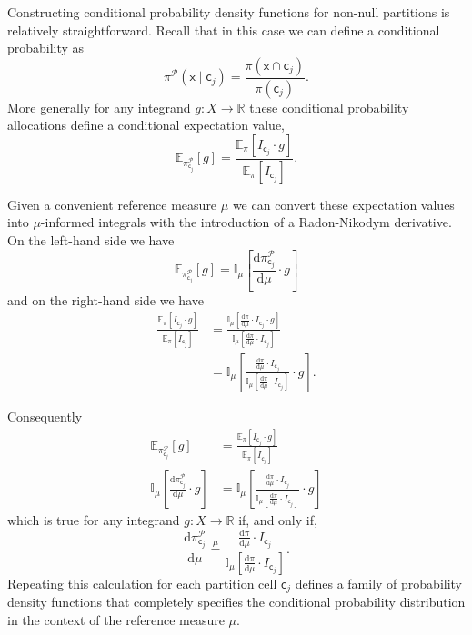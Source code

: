 \documentclass[11pt, oneside]{article}
\newcommand{\I}[2]{
  \ensuremath{ \mathbb{I}_{#1} \! \left[ #2 \right] }
}
\newcommand{\E}[2]{
  \ensuremath{ \mathbb{E}_{#1} \! \left[ #2 \right] }
}
\newcommand{\rnd}[2]{
  \ensuremath{ \frac{ \mathrm{d} #1}{ \mathrm{d} #2 } }
}
\begin{document}
Constructing conditional probability density functions for non-null 
partitions is relatively straightforward.  Recall that in this case 
we can define a conditional probability as
%
\begin{equation*}
\pi^{\mathcal{P}}( \mathsf{x} \mid \mathsf{c}_{j} )
=
\frac{ \pi( \mathsf{x} \cap \mathsf{c}_{j} ) }{ \pi( \mathsf{c}_{j} ) }.
\end{equation*}
%
More generally for any integrand $g : X \rightarrow \mathbb{R}$ these 
conditional probability allocations define a conditional expectation 
value,
%
\begin{equation*}
\E{ \pi^{\mathcal{P}}_{\mathsf{c}_{j}} }{g}
=
\frac{ \E{\pi}{ I_{\mathsf{c}_{j}} \cdot g } }
{ \E{\pi}{ I_{\mathsf{c}_{j}} } }.
\end{equation*}

Given a convenient reference measure $\mu$ we can convert these expectation 
values into $\mu$-informed integrals with the introduction of a Radon-Nikodym
derivative.  On the left-hand side we have
%
\begin{equation*}
\E{\pi^{\mathcal{P}}_{\mathsf{c}_{j}}}{g}
=
\I{\mu}{ \rnd{\pi^{\mathcal{P}}_{\mathsf{c}_{j}}}{\mu} \cdot g }
\end{equation*}
%
and on the right-hand side we have
%
\begin{align*}
\frac{ \E{\pi}{ I_{\mathsf{c}_{j}} \cdot g } }
{ \E{\pi}{ I_{\mathsf{c}_{j}} } }
&=
\frac{ \I{\mu}{ \rnd{\pi}{\mu} \cdot I_{\mathsf{c}_{j}} \cdot g } }
{ \I{\mu}{ \rnd{\pi}{\mu} \cdot I_{\mathsf{c}_{j}} } }
\\
&=
\I{\mu}{ 
\frac{ \rnd{\pi}{\mu} \cdot I_{\mathsf{c}_{j}} }
{ \I{\mu}{ \rnd{\pi}{\mu} \cdot I_{\mathsf{c}_{j}} } 
} \cdot g }.
\end{align*}

Consequently
%
\begin{align*}
\E{\pi^{\mathcal{P}}_{\mathsf{c}_{j}}}{g}
&=
\frac{ \E{\pi}{ I_{\mathsf{c}_{j}} \cdot g } }
{ \E{\pi}{ I_{\mathsf{c}_{j}} } }
\\
\I{\mu}{ \rnd{\pi^{\mathcal{P}}_{\mathsf{c}_{j}}}{\mu} \cdot g }
&=
\I{\mu}{ 
\frac{ \rnd{\pi}{\mu} \cdot I_{\mathsf{c}_{j}} }
{ \I{\mu}{ \rnd{\pi}{\mu} \cdot I_{\mathsf{c}_{j}} } 
} \cdot g }
\end{align*}
%
which is true for any integrand $g : X \rightarrow \mathbb{R}$ if, and only if, 
%
\begin{equation*}
\rnd{\pi^{\mathcal{P}}_{\mathsf{c}_{j}}}{\mu}
\overset{\mu}{=}
\frac{\rnd{\pi}{\mu} \cdot I_{\mathsf{c}_{j}} }
{ \I{\mu}{ \rnd{\pi}{\mu} \cdot I_{\mathsf{c}_{j}} } }.
\end{equation*}
%
Repeating this calculation for each partition cell $\mathsf{c}_{j}$ defines a family 
of probability density functions that completely specifies the conditional 
probability distribution in the context of the reference measure $\mu$.
\end{document}
